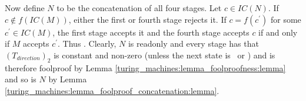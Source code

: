 	Now define $N$ to be the concatenation of all four stages. Let $c \in IC(N)$.
	If $c \notin f(IC(M))$, either the first or fourth stage rejects it.
	If $c = f(c^\prime)$ for some $c^\prime \in IC(M)$, the first stage accepts it and the fourth stage accepts $c$ if and only if $M$ accepts $c^\prime$. Thus .
%
	Clearly, $N$ is readonly and every stage has that $(T_{direction})_2$ is constant and non-zero (unless the next state is \ACC~or \REJ)
	and is therefore foolproof by Lemma \ref{turing_machines:lemma_foolproofness:lemma}
	and so is $N$ by Lemma \ref{turing_machines:lemma_foolproof_concatenation:lemma}.

\endproof
